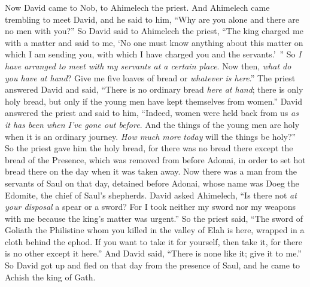 \begin{biblechapter} %
 Now David came to Nob, to Ahimelech the priest. And Ahimelech came trembling to meet David, and he said to him, “Why are you alone and there are no men with you?”
\verse So David said to Ahimelech the priest, “The king charged me with a matter and said to me, ‘No one must know anything about this matter on which I am sending you, with which I have charged you and the servants.’ ” So \textit{I have arranged to meet with my servants at a certain place}.
\verse Now then, \textit{what do you have at hand}? Give me five loaves of bread or \textit{whatever is here}.”
\verse The priest answered David and said, “There is no ordinary bread \textit{here at hand}; there is only holy bread, but only if the young men have kept themselves from women.”
\verse David answered the priest and said to him, “Indeed, women were held back from us \textit{as it has been when I’ve gone out before}. And the things of the young men are holy when it is an ordinary journey. \textit{How much more} \textit{today} will the things be holy?”
\verse So the priest gave him the holy bread, for there was no bread there except the bread of the Presence, which was removed from before Adonai, in order to set hot bread there on the day when it was taken away.
\verse Now there was a man from the servants of Saul on that day, detained before Adonai, whose name was Doeg the Edomite, the chief of Saul’s shepherds.
\verse David asked Ahimelech, “Is there not \textit{at your disposal} a spear or a sword? For I took neither my sword nor my weapons with me because the king’s matter was urgent.”
\verse So the priest said, “The sword of Goliath the Philistine whom you killed in the valley of Elah is here, wrapped in a cloth behind the ephod. If you want to take it for yourself, then take it, for there is no other except it here.” And David said, “There is none like it; give it to me.”
 So David got up and fled on that day from the presence of Saul, and he came to Achish the king of Gath.

\end{biblechapter}
